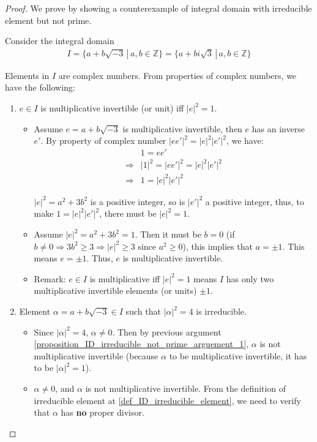 \documentclass[utf8]{ctexbook}
\theoremstyle{definition}
\begin{document}
\begin{proof}
We prove by showing a counterexample of integral domain with irreducible element but not prime. 

Consider the integral domain 
\begin{align*}
I = \{a + b \sqrt{-3} \, | \, a, b \in \mathbb{Z} \} = \{ a + b i \sqrt{3} \, | \, a, b \in \mathbb{Z} \}
\end{align*}

Elements in $I$ are complex numbers. From properties of complex numbers, we have the following:
\begin{enumerate}
\item{$e \in I$ is multiplicative invertible (or unit) iff $|e|^2 = 1$. \label{proposition_ID_irreducible_not_prime_arguement_1}}

\begin{itemize}
\item{Assume $e = a + b \sqrt{-3}$ is multiplicative invertible, then $e$ has an inverse $e'$. By property of complex number $|e e'|^2 = |e|^2 |e'|^2$, we have:
\begin{align*}
& 1 = e e' \\
\Longrightarrow & |1 |^2 = |e e'|^2 =  |e|^2 |e'|^2 \\
\Longrightarrow & 1 = |e|^2 |e'|^2
\end{align*}

$|e|^2 = a^2 + 3 b^2$ is a positive integer, so is $|e'|^2$ a positive integer, thus, to make $1 = |e|^2 |e'|^2$, there must be $|e|^2 =1 $.
}
\item{Assume $|e|^2 = a^2 + 3 b^2 = 1$. Then it must be $b = 0$ (if $b \neq 0  \Longrightarrow 3b^2 \geq 3 \Longrightarrow |e|^2 \geq 3$ since $a^2 \geq 0$), this implies that $a = \pm 1$. This means $e = \pm 1 $. Thus, $e$ is multiplicative invertible.}
\item{Remark: $e \in I$ is multiplicative iff $|e|^2 = 1$ means $I$ has only two multiplicative invertible elements (or units) $\pm 1$.}
\end{itemize}


\item{Element $\alpha = a + b \sqrt{-3} \in I$ such that $| \alpha |^2 = 4$ is irreducible.\label{proposition_ID_irreducible_not_prime_arguement_2}}

\begin{itemize}
\item{Since $| \alpha |^2 = 4$, $\alpha \neq 0$. Then by previous argument \ref{proposition_ID_irreducible_not_prime_arguement_1}, $ \alpha $ is not multiplicative invertible (because $ \alpha $ to be multiplicative invertible, it has to be $|\alpha|^2 = 1$). }
\item{$\alpha \neq 0$, and $ \alpha $ is not multiplicative invertible. From the definition of irreducible element at \ref{def_ID_irreducible_element}, we need to verify that $ \alpha $ has \textbf{no} proper divisor.

}
\end{itemize}
\end{enumerate}
\end{proof}
\end{document}
